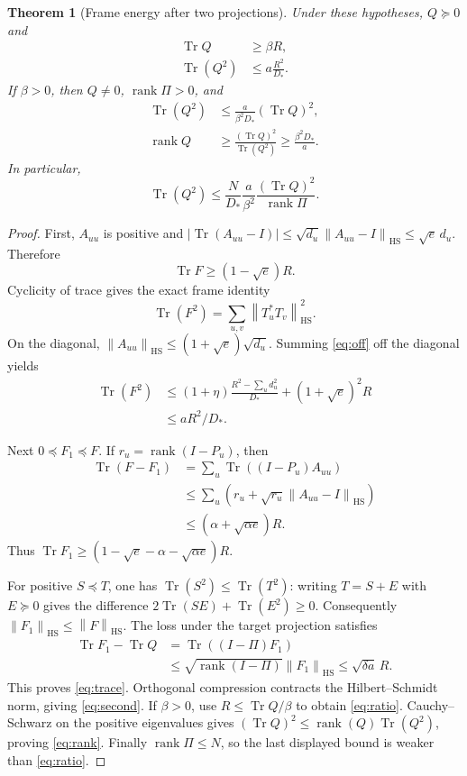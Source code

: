 \documentclass[11pt,letterpaper]{article}
\newtheorem{theorem}{Theorem}[section]
\theoremstyle{definition}
\theoremstyle{remark}
\newcommand{\tr}{\operatorname{Tr}}
\newcommand{\rank}{\operatorname{rank}}
\newcommand{\HS}{\mathrm{HS}}
\newcommand{\norm}[1]{\left\lVert#1\right\rVert}
\numberwithin{equation}{section}
\begin{document}
\begin{theorem}[Frame energy after two projections]\label{thm:frame}
Under these hypotheses, $Q\succeq0$ and
\begin{align}
 \tr Q&\ge\beta R,\label{eq:trace}\\
 \tr(Q^2)&\le a\frac{R^2}{D_*}.\label{eq:second}
\end{align}
If $\beta>0$, then $Q\ne0$, $\rank\Pi>0$, and
\begin{align}
 \tr(Q^2)&\le\frac{a}{\beta^2D_*}(\tr Q)^2,\label{eq:ratio}\\
 \rank Q&\ge\frac{(\tr Q)^2}{\tr(Q^2)}\ge\frac{\beta^2D_*}{a}.\label{eq:rank}
\end{align}
In particular,
\[
 \tr(Q^2)\le\frac{N}{D_*}\frac{a}{\beta^2}
 \frac{(\tr Q)^2}{\rank\Pi}.
\]
\end{theorem}

\begin{proof}
First, $A_{uu}$ is positive and $|\tr(A_{uu}-I)|\le\sqrt{d_u}\norm{A_{uu}-I}_{\HS}\le\sqrt e\,d_u$. Therefore
\[
 \tr F\ge(1-\sqrt e)R.
\]
Cyclicity of trace gives the exact frame identity
\[
 \tr(F^2)=\sum_{u,v}\norm{T_u^*T_v}_{\HS}^2.
\]
On the diagonal, $\norm{A_{uu}}_{\HS}\le(1+\sqrt e)\sqrt{d_u}$. Summing \eqref{eq:off} off the diagonal yields
\begin{align*}
 \tr(F^2)&\le (1+\eta)\frac{R^2-\sum_ud_u^2}{D_*}+(1+\sqrt e)^2R\\
 &\le aR^2/D_*.
\end{align*}

Next $0\preceq F_1\preceq F$. If $r_u=\rank(I-P_u)$, then
\begin{align*}
 \tr(F-F_1)
 &=\sum_u\tr((I-P_u)A_{uu})\\
 &\le\sum_u\left(r_u+\sqrt{r_u}\norm{A_{uu}-I}_{\HS}\right)\\
 &\le(\alpha+\sqrt{\alpha e})R.
\end{align*}
Thus $\tr F_1\ge(1-\sqrt e-\alpha-\sqrt{\alpha e})R$.

For positive $S\preceq T$, one has $\tr(S^2)\le\tr(T^2)$: writing $T=S+E$ with $E\succeq0$ gives the difference $2\tr(SE)+\tr(E^2)\ge0$. Consequently $\norm{F_1}_{\HS}\le\norm F_{\HS}$. The loss under the target projection satisfies
\begin{align*}
 \tr F_1-\tr Q
 &=\tr((I-\Pi)F_1)\\
 &\le\sqrt{\rank(I-\Pi)}\norm{F_1}_{\HS}
 \le\sqrt{\delta a}\,R.
\end{align*}
This proves \eqref{eq:trace}. Orthogonal compression contracts the Hilbert--Schmidt norm, giving \eqref{eq:second}. If $\beta>0$, use $R\le\tr Q/\beta$ to obtain \eqref{eq:ratio}. Cauchy--Schwarz on the positive eigenvalues gives $(\tr Q)^2\le\rank(Q)\tr(Q^2)$, proving \eqref{eq:rank}. Finally $\rank\Pi\le N$, so the last displayed bound is weaker than \eqref{eq:ratio}.
\end{proof}
\end{document}
